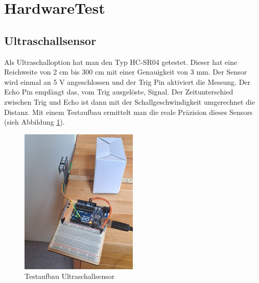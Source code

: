 \documentclass[../main.tex]{subfiles}
\begin{document}
\newpage
\section{HardwareTest}

\subsection{Ultraschallsensor}
Als Ultraschalloption hat man den Typ HC-SR04 getestet. Dieser hat eine Reichweite von 2 cm bis 300 cm mit einer Genauigkeit von 3 mm. Der Sensor wird einmal an 5 V angeschlossen und der Trig Pin aktiviert die Messung. Der Echo Pin empfängt das, vom Trig ausgelöste, Signal. Der Zeitunterschied zwischen Trig und Echo ist dann mit der Schallgeschwindigkeit umgerechnet die Distanz. Mit einem Testaufbau ermittelt man die reale Präzision dieses Sensors (sieh Abbildung \ref{fig:Ultraschall1}).

\begin{figure}[h] %
    \centering
    \includegraphics[width=0.5\textwidth]{img/sensortest/Ultraschall_Senkrecht.jpg} %
    \caption{Testaufbau Ultraschallsensor}
    \label{fig:Ultraschall1} %
\end{figure}
\end{document}
